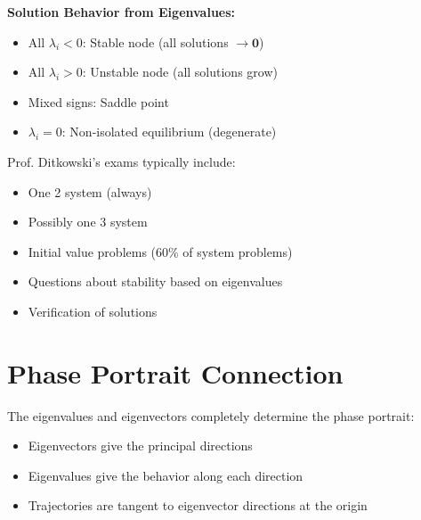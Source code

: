 \documentclass[12pt]{article}
\begin{document}
\begin{insight}
\textbf{Solution Behavior from Eigenvalues:}
\begin{itemize}
\item All $\lambda_{i} < 0$: Stable node (all solutions $\to \mathbf{0}$)
\item All $\lambda_{i} > 0$: Unstable node (all solutions grow)
\item Mixed signs: Saddle point
\item $\lambda_{i} = 0$: Non-isolated equilibrium (degenerate)
\end{itemize}
\end{insight}

\begin{examtip}
Prof. Ditkowski's exams typically include:
\begin{itemize}
\item One 2 system (always)
\item Possibly one 3 system
\item Initial value problems (60\% of system problems)
\item Questions about stability based on eigenvalues
\item Verification of solutions
\end{itemize}
\end{examtip}

\section{Phase Portrait Connection}

The eigenvalues and eigenvectors completely determine the phase portrait:
\begin{itemize}
\item Eigenvectors give the principal directions
\item Eigenvalues give the behavior along each direction
\item Trajectories are tangent to eigenvector directions at the origin
\end{itemize}

\end{document}
